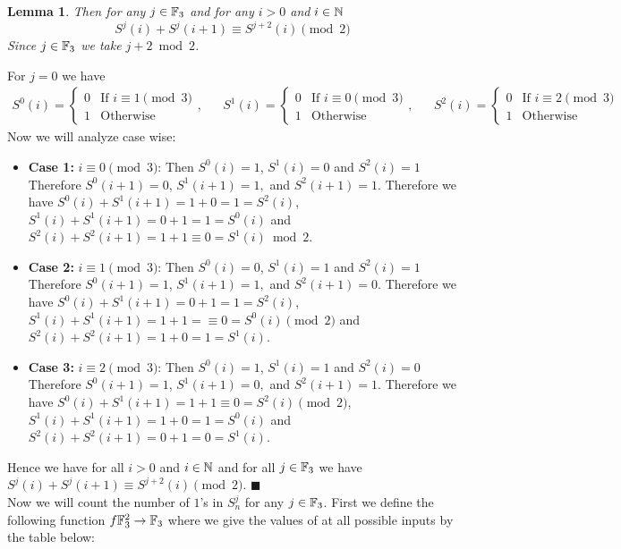 \documentclass[a4paper, 11pt]{article}
\newtheorem{lemma}{Lemma}
\renewenvironment{proof}{\noindent{\it \textbf{Proof:}}\hspace*{1em}}{\hfill $\blacksquare$\bigskip\\}
\begin{document}
{\begin{lemma}\label{p3lm2}
Then for any $j\in\mathbb{F}_3$ and for any $i>0$ and $i\in\mathbb{N}$ $$S^j(i)+S^j(i+1)\equiv S^{j+2}(i)\pmod 2$$Since $j\in\mathbb{F}_3$ we take $j+2\bmod 2$. 
\end{lemma}
\begin{proof}
	For $j=0$ we have \begin{align*}
		S^0(i)=\begin{cases}
			0 & \text{If $i\equiv 1\pmod 3$}\\
			1 & \text{Otherwise}
		\end{cases}, && S^1(i)=\begin{cases}
		0 & \text{If $i\equiv 0\pmod 3$}\\
		1 & \text{Otherwise}
	\end{cases}, &&S^2(i)=\begin{cases}
	0 & \text{If $i\equiv 2\pmod 3$}\\
	1 & \text{Otherwise}
\end{cases} 
	\end{align*}
Now we will analyze case wise:\begin{itemize}
	\item \textbf{Case 1:} $i\equiv 0\pmod 3$: Then $S^0(i)=1$, $ S^1(i)=0$ and $ S^{2}(i)=1$ Therefore $S^0(i+1)=0$, $S^1(i+1)=1,$ and $ S^{2}(i+1)=1$. Therefore we have $S^0(i)+S^1(i+1)=1+0=1=S^2(i)$, $S^1(i)+S^1(i+1)=0+1=1=S^0(i)$ and $S^2(i)+S^2(i+1)=1+1\equiv 0=S^1(i)\bmod 2$.
	\item \textbf{Case 2:} $i\equiv 1\pmod 3$: Then $S^0(i)=0$, $ S^1(i)=1$ and $ S^{2}(i)=1$ Therefore $S^0(i+1)=1$, $S^1(i+1)=1,$ and $ S^{2}(i+1)=0$. Therefore we have $S^0(i)+S^1(i+1)=0+1=1=S^2(i)$, $S^1(i)+S^1(i+1)=1+1=\equiv 0=S^0(i)\pmod 2$ and $S^2(i)+S^2(i+1)=1+0=1=S^1(i)$.
	\item \textbf{Case 3:} $i\equiv 2\pmod 3$: Then $S^0(i)=1$, $ S^1(i)=1$ and $ S^{2}(i)=0$ Therefore $S^0(i+1)=1$, $S^1(i+1)=0,$ and $ S^{2}(i+1)=1$. Therefore we have $S^0(i)+S^1(i+1)=1+1\equiv 0=S^2(i)\pmod 2$, $S^1(i)+S^1(i+1)=1+0=1=S^0(i)$ and $S^2(i)+S^2(i+1)=0+1= 0=S^1(i)$.
\end{itemize}Hence we have for all $i>0$ and $i\in\mathbb{N}$ and for all $j\in\mathbb{F}_3$ we have $S^j(i)+S^j(i+1)\equiv S^{j+2}(i)\pmod 2$. 
\end{proof}Now we will count the number of $1$'s in $S^j_n$ for any $j\in\mathbb{F}_3$. First we define the following function $f\mathbb{F}_3^2\to\mathbb{F}_3$ where we give the values of at all possible inputs by the table below:

}
\end{document}

